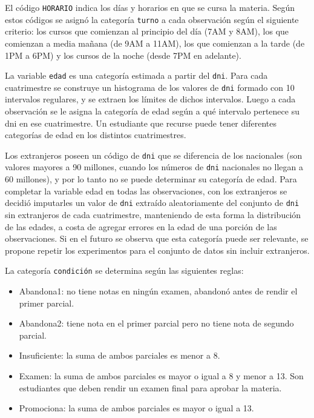 \documentclass[a4paper,11pt,dvipsnames]{article}
\begin{document}
El código \texttt{HORARIO} indica los días y horarios en que se cursa la materia. Según estos códigos se asignó la categoría \texttt{turno} a cada observación según el siguiente criterio: los cursos que comienzan al principio del día (7AM y 8AM), los que comienzan a media mañana (de 9AM a 11AM), los que comienzan a la tarde (de 1PM a 6PM) y los cursos de la noche (desde 7PM en adelante).\par\medskip

La variable \texttt{edad} es una categoría estimada a partir del \texttt{dni}. Para cada cuatrimestre se construye un histograma de los valores de \texttt{dni} formado con 10 intervalos regulares, y se extraen los límites de dichos intervalos. Luego a cada observación se le asigna la categoría de edad según a qué intervalo pertenece su dni en ese cuatrimestre. Un estudiante que recurse puede tener diferentes categorías de edad en los distintos cuatrimestres.\par\medskip

Los extranjeros poseen un código de \texttt{dni} que se diferencia de los nacionales (son valores mayores a 90 millones, cuando los números de \texttt{dni} nacionales no llegan a 60 millones), y por lo tanto no se puede determinar su categoría de edad. Para completar la variable edad en todas las observaciones, con los extranjeros se decidió imputarles un valor de \texttt{dni} extraído aleatoriamente del conjunto de \texttt{dni} sin extranjeros de cada cuatrimestre, manteniendo de esta forma la distribución de las edades, a costa de agregar errores en la edad de una porción de las observaciones. Si en el futuro se observa que esta categoría puede ser relevante, se propone repetir los experimentos para el conjunto de datos sin incluir extranjeros.\par\medskip

La categoría \texttt{condición} se determina según las siguientes reglas:
\begin{itemize}
    \item Abandona1: no tiene notas en ningún examen, abandonó antes de rendir el primer parcial.
    \item Abandona2: tiene nota en el primer parcial pero no tiene nota de segundo parcial.
    \item Insuficiente: la suma de ambos parciales es menor a 8.
    \item Examen: la suma de ambos parciales es mayor o igual a 8 y menor a 13. Son estudiantes que deben rendir un examen final para aprobar la materia.
    \item Promociona: la suma de ambos parciales es mayor o igual a 13.
\end{itemize}
\end{document}
